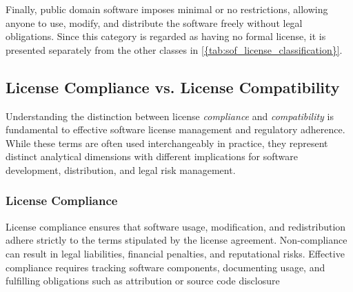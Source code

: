 Finally, public domain software imposes minimal or no restrictions, allowing anyone to use, modify, and distribute the software freely without legal obligations. Since this category is regarded as having no formal license, it is presented separately from the other classes in \cref{{tab:sof_license_classification}}.





\begin{table}[ht]
\centering
\caption{Classification of Software Licenses.}
\label{tab:sof_license_classification}
\end{table}


\subsection{License Compliance vs. License Compatibility}
\label{sec:compliance_compatibility}

Understanding the distinction between license \emph{compliance} and \emph{compatibility} is fundamental to effective software license management and regulatory adherence. While these terms are often used interchangeably in practice, they represent distinct analytical dimensions with different implications for software development, distribution, and legal risk management.

\subsubsection{License Compliance}

License compliance ensures that software usage, modification, and redistribution adhere strictly to the terms stipulated by the license agreement. Non-compliance can result in legal liabilities, financial penalties, and reputational risks. Effective compliance requires tracking software components, documenting usage, and fulfilling obligations such as attribution or source code disclosure



